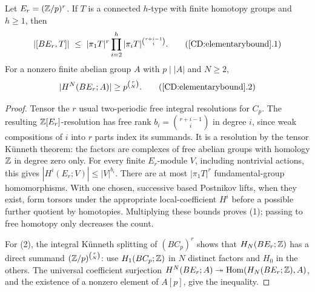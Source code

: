 \begin{lemma}
\label{CD:elementarybound}
Let $E_r=(\mathbb Z/p)^r$.  If $T$ is a connected $h$-type with finite
homotopy groups and $h\ge1$, then
\[
 |[BE_r,T]|\ \le\
 |\pi_1T|^r
 \prod_{i=2}^{h}|\pi_iT|^{\binom{r+i-1}{i}}.
 \tag{\ref{CD:elementarybound}.1}
\]
For a nonzero finite abelian group $A$ with $p\mid |A|$ and $N\ge2$,
\[
                   |H^N(BE_r;A)|\ge p^{\binom rN}.
 \tag{\ref{CD:elementarybound}.2}
\]
\end{lemma}
\begin{proof}
Tensor the $r$ usual two-periodic free integral resolutions for $C_p$.
The resulting $\mathbb Z[E_r]$-resolution has free rank
$b_i=\binom{r+i-1}{i}$ in degree $i$, since weak compositions of $i$
into $r$ parts index its summands.  It is a resolution by the tensor
K\"unneth theorem: the factors are complexes of free abelian groups with
homology $\mathbb Z$ in degree zero only.  For every finite $E_r$-module $V$,
including nontrivial actions, this gives
$|H^i(E_r;V)|\le |V|^{b_i}$.
There are at most $|\pi_1T|^r$ fundamental-group homomorphisms.
With one chosen, successive based Postnikov lifts, when they exist,
form torsors under the appropriate local-coefficient $H^i$ before a
possible further quotient by homotopies.  Multiplying these bounds
proves (1); passing to free homotopy only decreases the count.

For (2), the integral K\"unneth splitting of
$(BC_p)^r$ shows that $H_N(BE_r;\mathbb Z)$ has a direct summand
$(\mathbb Z/p)^{\binom rN}$: use $H_1(BC_p;\mathbb Z)$ in $N$ distinct factors
and $H_0$ in the others.  The universal coefficient surjection
$H^N(BE_r;A)\twoheadrightarrow\operatorname{Hom}(H_N(BE_r;\mathbb Z),A)$,
and the existence of a nonzero element of $A[p]$, give the inequality.
\end{proof}

